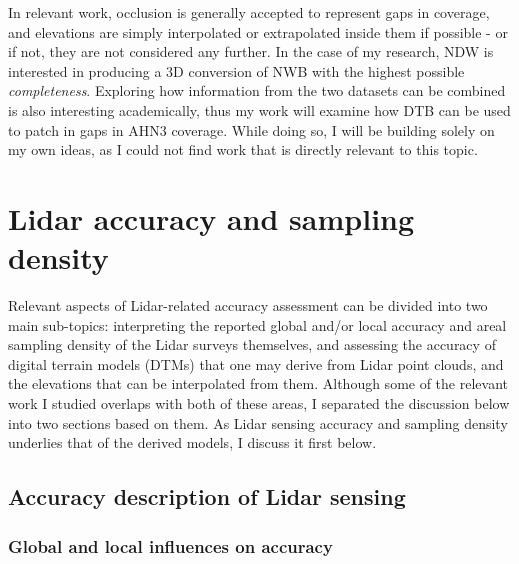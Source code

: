In relevant work, occlusion is generally accepted to represent gaps in coverage, and elevations are simply interpolated or extrapolated inside them if possible - or if not, they are not considered any further. In the case of my research, NDW is interested in producing a 3D conversion of NWB with the highest possible \textit{completeness}. Exploring how information from the two datasets can be combined is also interesting academically, thus my work will examine how DTB can be used to patch in gaps in AHN3 coverage. While doing so, I will be building solely on my own ideas, as I could not find work that is directly relevant to this topic.

\section{Lidar accuracy and sampling density}
\label{sec:lidaraccuracy}

Relevant aspects of Lidar-related accuracy assessment can be divided into two main sub-topics: interpreting the reported global and/or local accuracy and areal sampling density of the Lidar surveys themselves, and assessing the accuracy of digital terrain models (DTMs) that one may derive from Lidar point clouds, and the elevations that can be interpolated from them. Although some of the relevant work I studied overlaps with both of these areas, I separated the discussion below into two sections based on them. As Lidar sensing accuracy and sampling density underlies that of the derived models, I discuss it first below.

\subsection{Accuracy description of Lidar sensing}
\label{sub:lidaraccuracy_sensing}

\subsubsection{Global and local influences on accuracy}

